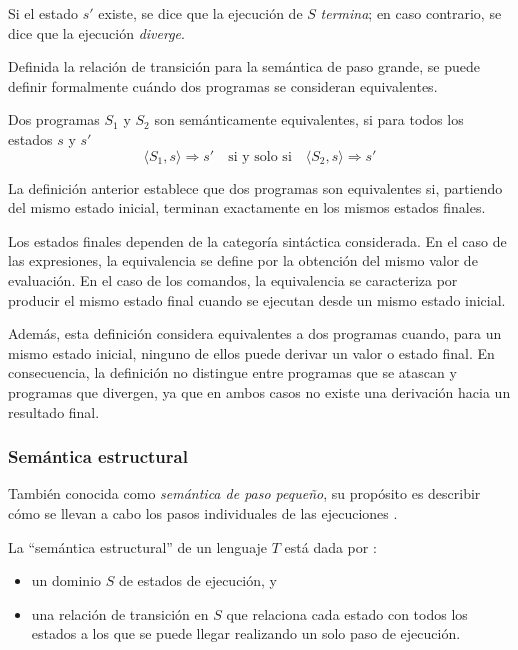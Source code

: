 Si el estado \(s'\) existe, se dice que la ejecución de \(S\) \emph{termina}; en caso contrario, se dice que la ejecución  \emph{diverge}. 


Definida la relación de transición para la semántica de paso grande, se puede definir formalmente cuándo dos programas se consideran equivalentes. 

\begin{definition}
Dos programas $S_1$ y $S_2$ son semánticamente equivalentes, si para todos los estados $s$ y $s'$  
\[
\langle S_1, s \rangle \Rightarrow s'
\quad \text{si y solo si} \quad
\langle S_2, s \rangle \Rightarrow s'
\]
\end{definition}


La definición anterior establece que dos programas son equivalentes si, partiendo del mismo estado inicial, terminan exactamente en los mismos estados finales.


Los estados finales dependen de la categoría sintáctica considerada. En el caso de las expresiones, la equivalencia se define por la obtención del mismo valor de evaluación. En el caso de los comandos, la equivalencia se caracteriza por producir el mismo estado final cuando se ejecutan desde un mismo estado inicial.

Además, esta definición considera equivalentes a dos programas cuando, para un mismo estado inicial,  ninguno de ellos puede derivar un valor o estado final. En consecuencia, la definición no distingue entre programas que se atascan y programas que divergen, ya que en ambos casos no existe una derivación hacia un resultado final.



\subsubsection{Semántica estructural}
También conocida como \emph{semántica de paso pequeño}, su propósito es describir cómo se llevan a cabo los pasos individuales de las ejecuciones \cite{nielson1992semantics}.


La \enquote{semántica estructural} de un lenguaje $T$ está dada por \cite{hutton2023semantics}:
\begin{itemize}
    \item un dominio $S$ de estados de ejecución, y
    \item una relación de transición en $S$ que relaciona cada estado con todos los estados a los que se puede llegar realizando un solo paso de ejecución.
\end{itemize}

